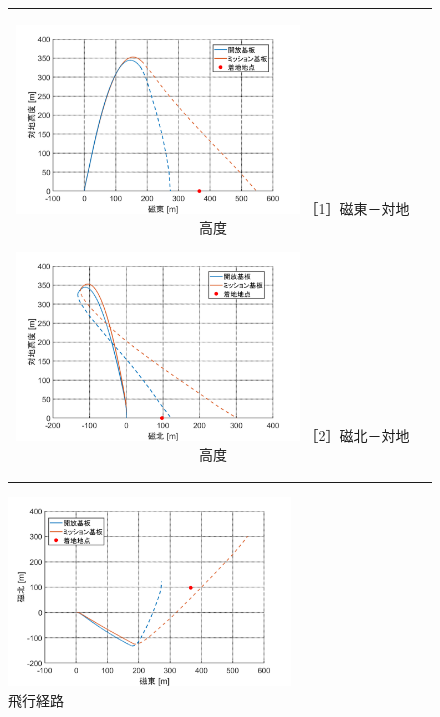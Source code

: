 \documentclass[a4paper,11pt,uplatex]{jsarticle}
\begin{document}
\begin{figure}[H]
	\begin{tabular}{cc}
		\begin{minipage}{.48\textwidth}
			\centering
			\includegraphics[width=75mm]{pic_sim/pos2_eh.png}
			\hspace{16mm} {\small［1］磁東－対地高度}
		\end{minipage}
		\begin{minipage}{.48\textwidth}
			\centering
			\includegraphics[width=75mm]{pic_sim/pos2_nh.png}
			\hspace{16mm} {\small［2］磁北－対地高度}
		\end{minipage}
	\end{tabular}
	\centering
	\begin{minipage}{.48\textwidth}
		\centering
		\includegraphics[width=75mm]{pic_sim/pos2_en.png}
		\hspace{16mm}{\small［3］磁東－磁北}
	\end{minipage}
	\caption{飛行経路}
	\label{fig:hikoukeiro}
\end{figure}
\end{document}
